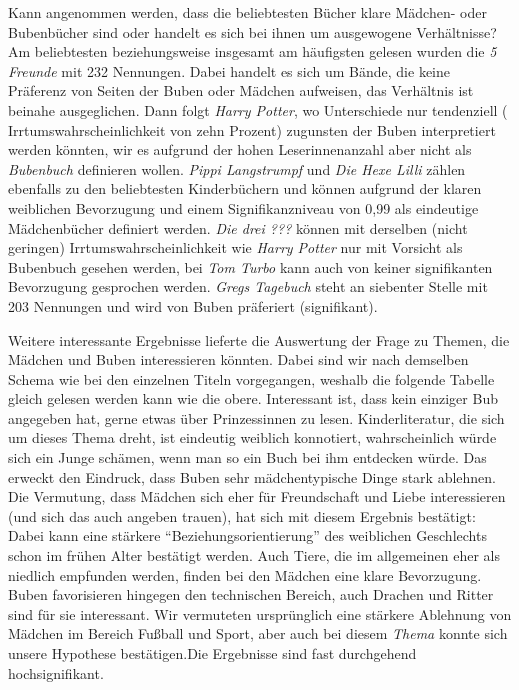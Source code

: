 

Kann angenommen werden, dass die beliebtesten Bücher klare Mädchen- oder
Bubenbücher sind oder handelt es sich bei ihnen um ausgewogene
Verhältnisse? Am beliebtesten beziehungsweise insgesamt am häufigsten
gelesen wurden die \emph{5 Freunde} mit 232 Nennungen. Dabei handelt es
sich um Bände, die keine Präferenz von Seiten der Buben oder Mädchen
aufweisen, das Verhältnis ist beinahe ausgeglichen. Dann folgt
\emph{Harry Potter}, wo Unterschiede nur tendenziell (
Irrtumswahrscheinlichkeit von zehn Prozent) zugunsten der Buben
interpretiert werden könnten, wir es aufgrund der hohen Leserinnenanzahl
aber nicht als \emph{Bubenbuch} definieren wollen. \emph{Pippi
Langstrumpf} und \emph{Die Hexe Lilli} zählen ebenfalls zu den
beliebtesten Kinderbüchern und können aufgrund der klaren weiblichen
Bevorzugung und einem Signifikanzniveau von 0,99 als eindeutige
Mädchenbücher definiert werden. \emph{Die drei ???} können mit derselben
(nicht geringen) Irrtumswahrscheinlichkeit wie \emph{Harry Potter} nur
mit Vorsicht als Bubenbuch gesehen werden, bei \emph{Tom Turbo} kann
auch von keiner signifikanten Bevorzugung gesprochen werden. \emph{Gregs
Tagebuch} steht an siebenter Stelle mit 203 Nennungen und wird von Buben
präferiert (signifikant).

Weitere interessante Ergebnisse lieferte die Auswertung der Frage zu
Themen, die Mädchen und Buben interessieren könnten. Dabei sind wir nach
demselben Schema wie bei den einzelnen Titeln vorgegangen, weshalb die
folgende Tabelle gleich gelesen werden kann wie die obere. Interessant
ist, dass kein einziger Bub angegeben hat, gerne etwas über
Prinzessinnen zu lesen. Kinderliteratur, die sich um dieses Thema dreht,
ist eindeutig weiblich konnotiert, wahrscheinlich würde sich ein Junge
schämen, wenn man so ein Buch bei ihm entdecken würde. Das erweckt den
Eindruck, dass Buben sehr mädchentypische Dinge stark ablehnen. Die
Vermutung, dass Mädchen sich eher für Freundschaft und Liebe
interessieren (und sich das auch angeben trauen), hat sich mit diesem
Ergebnis bestätigt: Dabei kann eine stärkere ``Beziehungsorientierung''
des weiblichen Geschlechts schon im frühen Alter bestätigt werden. Auch
Tiere, die im allgemeinen eher als niedlich empfunden werden, finden bei
den Mädchen eine klare Bevorzugung. Buben favorisieren hingegen den
technischen Bereich, auch Drachen und Ritter sind für sie interessant.
Wir vermuteten ursprünglich eine stärkere Ablehnung von Mädchen im
Bereich Fußball und Sport, aber auch bei diesem \emph{Thema} konnte sich
unsere Hypothese bestätigen.Die Ergebnisse sind fast durchgehend
hochsignifikant.

